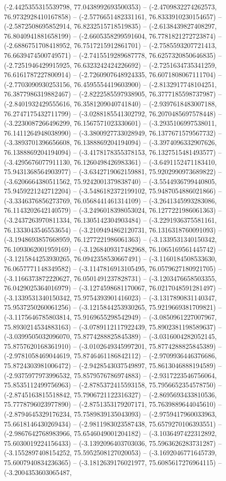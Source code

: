 (-2.4425355315539798, 77.0438992693500353) -- (-2.4709832274262573, 76.9732928410167858) -- (-2.5776651482331161, 76.8333910230154657) -- (-2.5872508695852914, 76.8232515718519835) -- (-2.6138439827408297, 76.8040941881658199) -- (-2.6605358299591604, 76.7781821272723874) -- (-2.6886751708418952, 76.7517215912861701) -- (-2.7585593207721413, 76.6639474500749571) -- (-2.7415519289687778, 76.6257320850646835) -- (-2.7251946429915925, 76.6323242424226692) -- (-2.7251634735341259, 76.6161787227800914) -- (-2.7260907648924335, 76.6071808067111704) -- (-2.7703090930253156, 76.4595554419603900) -- (-2.8132917748104251, 76.3877986319882467) -- (-2.8222585597938905, 76.3777185598737987) -- (-2.8401932429555616, 76.3581209040741840) -- (-2.9397618483007188, 76.2747175432711799) -- (-3.0288185541302792, 76.2070485697578448) -- (-3.2230087266496299, 76.1567571023330601) -- (-3.2935106997538011, 76.1411264948038990) -- (-3.3800927733028949, 76.1377671579567732) -- (-3.3893701396656608, 76.1388869204194094) -- (-3.3974096332907626, 76.1388869204194094) -- (-3.4178178355378153, 76.1327515481493577) -- (-3.4295676077911130, 76.1260498426983361) -- (-3.6491152471183410, 75.9431368564903977) -- (-3.6342719062159881, 75.9202990973689822) -- (-3.6206664380511562, 75.9242001379838740) -- (-3.5544936799440805, 75.9459221242712204) -- (-3.5486182372199102, 75.9487054886021866) -- (-3.3346376856273769, 76.0568441461314109) -- (-3.2641345993283086, 76.1143202642140579) -- (-3.2496018398053024, 76.1277221986061363) -- (-3.2437263970811334, 76.1305142304903484) -- (-3.2291936375581161, 76.1333043546553654) -- (-3.2109494862120731, 76.1316318760091093) -- (-3.1948693857668959, 76.1277221986061363) -- (-3.1339531340150342, 76.1093062001959169) -- (-3.1268409317482968, 76.1065169561445742) -- (-3.1215844253930265, 76.0942358530667491) -- (-3.1160184508533630, 76.0657771148349582) -- (-3.1147816913105495, 76.0579627180921705) -- (-3.1166373872220627, 76.0501491237828731) -- (-3.1203476658503355, 76.0429025364016979) -- (-3.1274598681170067, 76.0217048591281497) -- (-3.1339531340150342, 75.9754393901416023) -- (-3.1317890831140347, 75.9537250260061256) -- (-3.1215844253930265, 75.9219669381709821) -- (-3.1175646785803814, 75.9169655298542949) -- (-3.0850961227007967, 75.8930214534883163) -- (-3.0789112117922439, 75.8902381198589637) -- (-3.0399505032096070, 75.8774288825845389) -- (-3.0316004282052145, 75.8757620168361910) -- (-3.0102649345997201, 75.8774288825845389) -- (-2.9781058469044619, 75.8746461186842112) -- (-2.9709936446376686, 75.8724303981006472) -- (-2.9428543037549897, 75.8613046888194589) -- (-2.9375977973996532, 75.8579576786974883) -- (-2.9317223546756064, 75.8535112499756963) -- (-2.8785372415593158, 75.7956652354578750) -- (-2.8745163815518842, 75.7906721122316327) -- (-2.8695693433810536, 75.7778796023977890) -- (-2.8751353179207171, 75.7639889644045610) -- (-2.8794645329176234, 75.7589839135043093) -- (-2.9759417960033963, 75.6618146430269434) -- (-2.9811983023587438, 75.6579270106393551) -- (-2.9867642768983966, 75.6546049001204182) -- (-3.1036497422312892, 75.6030019224156433) -- (-3.1392096403703036, 75.5963626283731287) -- (-3.1552897408154252, 75.5952508127020053) -- (-3.1692046771645739, 75.6007940834236365) -- (-3.1812639176021977, 75.6085617276964115) -- (-3.2004353603065487, 